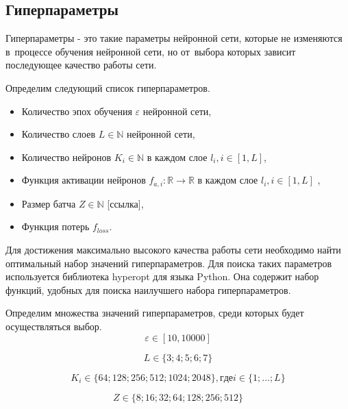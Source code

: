 \subsection{Гиперпараметры}\label{subsec:hyperparameters}

\begin{definition}
  Гиперпараметры - это такие параметры нейронной сети, которые не изменяются в~процессе обучения нейронной сети, но от~выбора которых зависит последующее качество работы сети.
\end{definition}

Определим следующий список гиперпараметров.
\begin{itemize}
  \item Количество эпох обучения $\mathbb{\varepsilon}$ нейронной сети,
  \item Количество слоев $L \in \mathbb{N}$ нейронной сети,
  \item Количество нейронов $K_i \in \mathbb{N}$ в каждом слое $l_i, i \in [1, L]$,
  \item Функция активации\cite[раздел activations]{bib:keras} нейронов $f_{a,i}: \mathbb{R} \rightarrow \mathbb{R}$ в каждом слое $l_i, i \in [1, L]$ ,
  \item Размер батча $Z \in \mathbb{N}$ [ссылка],
  \item Функция потерь\cite[раздел losses]{bib:keras} $f_{loss}$.
\end{itemize}

Для достижения максимально высокого качества работы сети необходимо найти оптимальный набор значений гиперпараметров.
Для поиска таких параметров используется библиотека hyperopt\cite{bib:hyperopt} для языка Python.
Она содержит набор функций, удобных для поиска наилучшего набора гиперпараметров.

Определим множества значений гиперпараметров, среди которых будет осуществляться выбор.
\begin{equation}\label{eq:hyper1}
  \mathbb{\varepsilon} \in [10, 10000]
\end{equation}

\begin{equation}\label{eq:hyper1}
  L \in \{3; 4; 5; 6; 7\}
\end{equation}

\begin{equation}\label{eq:hyper2}
  K_i \in \{64; 128; 256; 512; 1024; 2048\}, где i \in \{1; \dots; L\}
\end{equation}

\begin{equation}\label{eq:hyper3}
  Z \in \{8; 16; 32; 64; 128; 256; 512\}
\end{equation}

